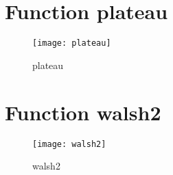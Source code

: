 \newpage

\section{Function plateau}

\begin{center}

\end{center}

\begin{center}

\end{center}

\begin{figure}[h]
\begin{center}
\texttt{[image: plateau]}
\caption{plateau}
\end{center}
\end{figure}

\newpage

\section{Function walsh2}

\begin{center}

\end{center}

\begin{center}

\end{center}

\begin{figure}[h]
\begin{center}
\texttt{[image: walsh2]}
\caption{walsh2}
\end{center}
\end{figure}

